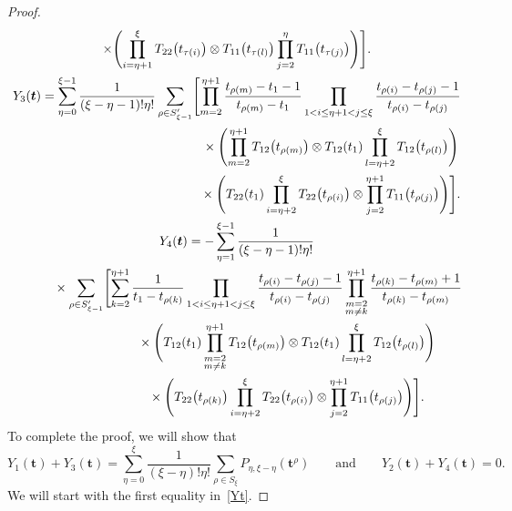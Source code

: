 \documentclass[10pt,a4paper]{amsart}
\numberwithin{equation}{section}
\begin{document}
\begin{proof}
\begin{gather*}
 \times\Biggl( \prod_{i=\eta+1}^{\xi } T _{22}\bigl(t_{\tau(i)}\bigr)\otimes T_{11}\bigl(t_{\tau(l)}\bigr)\prod_{j=2}^{\eta} T _{11}\bigl(t_{\tau(j)}\bigr)\Biggr) \Biggr].
\\
Y_3(\boldsymbol{t}) = \sum_{\eta=0}^{\xi-1} \frac{1}{(\xi-\eta-1) ! \eta!} \sum_{\rho\in S_{\xi-1}'} \Biggl[ \prod_{m=2}^{\eta+1 } \frac{t_{\rho(m)}-t_1-1}{t_{\rho(m)}-t_1} \prod_{1< i\leq\eta+1<j \leq \xi} \frac{t_{\rho(i)}-t_{\rho(j)}-1}{t_{\rho(i)}-t_{\rho(j)}} \\
\hphantom{Y_3(\boldsymbol{t}) = \sum_{\eta=0}^{\xi-1} \frac{1}{(\xi-\eta-1) ! \eta!} \sum_{\rho\in S_{\xi-1}'} \Biggl[}{}
 \times\Biggl( \prod_{m=2}^{\eta+1 } T_{12} \bigl(t_{\rho(m)}\bigr) \otimes T_{12}(t_1) \prod_{l=\eta+2}^{\xi } T_{12} \bigl(t_{\rho(l)}\bigr) \Biggr) \\
\hphantom{Y_3(\boldsymbol{t}) = \sum_{\eta=0}^{\xi-1} \frac{1}{(\xi-\eta-1) ! \eta!} \sum_{\rho\in S_{\xi-1}'} \Biggl[}{}
 \times\Biggl(T_{22}(t_1)\prod_{i=\eta+2}^{\xi } T _{22}\bigl(t_{\rho(i)}\bigr)\otimes \prod_{j=2}^{\eta+1} T _{11}\bigl(t_{\rho(j)}\bigr)\Biggr) \Biggr].
\\
Y_4(\boldsymbol{t})= -\sum_{\eta=1}^{\xi-1} \frac{1}{(\xi-\eta-1) ! \eta!} \\
\hphantom{Y_4(\boldsymbol{t})=}{}
 \times\sum_{\rho\in S_{\xi-1}'} \Biggl[ \sum_{k=2}^{\eta+1} \frac{1}{t_1-t_{\rho(k)}} \prod_{1< i\leq\eta+1<j \leq \xi} \frac{t_{\rho(i)}-t_{\rho(j)}-1}{t_{\rho(i)}-t_{\rho(j)}} \prod_{\substack{m=2\\m\neq k}}^{\eta+1} \frac{t_{\rho(k)}-t_{\rho(m)}+1}{t_{\rho(k)}-t_{\rho(m)}} \\
\hphantom{Y_4(\boldsymbol{t})=\times\sum_{\rho\in S_{\xi-1}'} \Biggl[}{}
 \times\Biggl(T_{12}(t_1) \prod_{\substack{m=2\\m\neq k}}^{\eta+1} T_{12} \bigl(t_{\rho(m)}\bigr) \otimes T_{12}(t_1) \prod_{l=\eta+2}^{\xi } T_{12} \bigl(t_{\rho(l)}\bigr) \Biggr) \\
\hphantom{Y_4(\boldsymbol{t})=\times\sum_{\rho\in S_{\xi-1}'} \Biggl[}{}
 \times\Biggl( T_{22}\bigl(t_{\rho(k)}\bigr)\prod_{i=\eta+2}^{\xi } T _{22}\bigl(t_{\rho(i)}\bigr)\otimes \prod_{j=2}^{\eta+1} T _{11}\bigl(t_{\rho(j)}\bigr)\Biggr) \Biggr].
\end{gather*}
To complete the proof, we will show that
\begin{equation}\label{Yt}
Y_1(\boldsymbol{t})+Y_3(\boldsymbol{t})=\sum_{\eta=0}^\xi \frac{1}{(\xi-\eta)!\eta!}\sum_{\rho\in S_\xi}P_{\eta,\xi-\eta}(\boldsymbol{t}^\rho) \qquad \text{and} \qquad Y_2(\boldsymbol{t})+Y_4(\boldsymbol{t})=0.
\end{equation}
We will start with the first equality in~\eqref{Yt}.


\end{proof}
\end{document}
